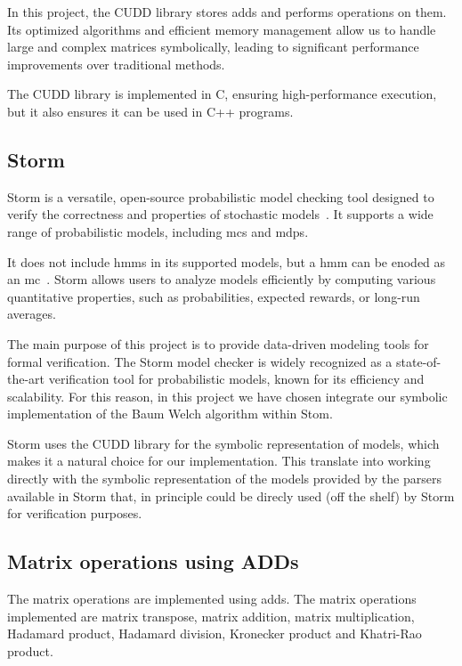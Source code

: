 In this project, the CUDD library stores \glspl{add} and performs operations on them.
Its optimized algorithms and efficient memory management allow us to handle large and complex matrices symbolically, leading to significant performance improvements over traditional methods.

The CUDD library is implemented in C, ensuring high-performance execution, but it also ensures it can be used in C++ programs.

\subsection{Storm}\label{subsec:storm}

Storm is a versatile, open-source probabilistic model checking tool designed to verify the correctness and properties of stochastic models~\cite{hensel2021probabilistic}. 
It supports a wide range of probabilistic models, including \glspl{mc} and \glspl{mdp}.

It does not include \glspl{hmm} in its supported models, but a \gls{hmm} can be enoded as an \gls{mc}~\cite{rabiner1989tutorial}.
Storm allows users to analyze models efficiently by computing various quantitative properties, such as probabilities, expected rewards, or long-run averages.

The main purpose of this project is to provide data-driven modeling tools for formal verification.
The Storm model checker is widely recognized as a state-of-the-art verification tool for probabilistic models, known for its efficiency and scalability.
For this reason, in this project we have chosen integrate our symbolic implementation of the Baum Welch algorithm within Stom. 

Storm uses the CUDD library for the symbolic representation of models, which makes it a natural choice for our implementation.
This translate into working directly with the symbolic representation of the models provided by the parsers available in Storm that, in principle could be direcly used (off the shelf) by Storm for verification purposes.

\subsection{Matrix operations using ADDs}\label{subsec:matrix-operations-using-adds}
The matrix operations are implemented using \glspl{add}.
The matrix operations implemented are matrix transpose, matrix addition, matrix multiplication, Hadamard product, Hadamard division, Kronecker product and Khatri-Rao product.

